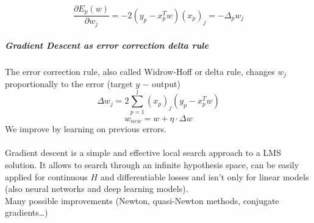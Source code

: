 \documentclass[10pt]{report}
\begin{document}
$$\frac{\partial E_p(w)}{\partial w_j} = -2(y_p - x_p^T w)(x_p)_j = -\Delta_p w_j$$
\subparagraph{Gradient Descent as error correction delta rule} The error correction rule, also called Widrow-Hoff or delta rule, changes $w_j$ proportionally to the error (target $y$ $-$ output)
$$\Delta w_j = 2 \sum_{p=1}^l (x_p)_j (y_p - x_p^T w)$$
$$w_{new} = w + \eta\cdot\Delta w$$
We improve by learning on previous errors.\\\\
Gradient descent is a simple and effective local search approach to a LMS solution. It allows to search through an infinite hypothesis space, can be easily applied for continuous $H$ and differentiable losses and isn't only for linear models (also neural networks and deep learning models).\\
Many possible improvements (Newton, quasi-Newton methods, conjugate gradients\ldots)
\end{document}
